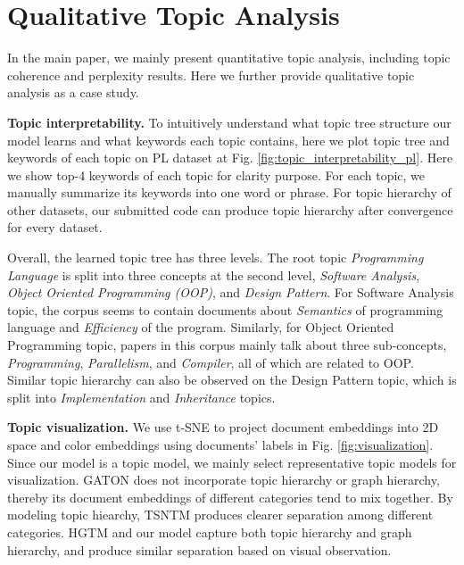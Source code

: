 \section{Qualitative Topic Analysis}
\label{sec:qualitative_topic_analysis}

In the main paper, we mainly present quantitative topic analysis, including topic coherence and perplexity results. Here we further provide qualitative topic analysis as a case study.

\textbf{Topic interpretability.} To intuitively understand what topic tree structure our model learns and what keywords each topic contains, here we plot topic tree and keywords of each topic on PL dataset at Fig. \ref{fig:topic_interpretability_pl}. Here we show top-4 keywords of each topic for clarity purpose. For each topic, we manually summarize its keywords into one word or phrase. For topic hierarchy of other datasets, our submitted code can produce topic hierarchy after convergence for every dataset.

Overall, the learned topic tree has three levels. The root topic \textit{Programming Language} is split into three concepts at the second level, \textit{Software Analysis}, \textit{Object Oriented Programming (OOP)}, and \textit{Design Pattern}. For Software Analysis topic, the corpus seems to contain documents about \textit{Semantics} of programming language and \textit{Efficiency} of the program. Similarly, for Object Oriented Programming topic, papers in this corpus mainly talk about three sub-concepts, \textit{Programming}, \textit{Parallelism}, and \textit{Compiler}, all of which are related to OOP. Similar topic hierarchy can also be observed on the Design Pattern topic, which is split into \textit{Implementation} and \textit{Inheritance} topics.

\textbf{Topic visualization.} %
We use t-SNE \cite{tsne} to project document embeddings into 2D space and color embeddings using documents' labels in Fig. \ref{fig:visualization}. Since our model is a topic model, we mainly select representative topic models for visualization. GATON does not incorporate topic hierarchy or graph hierarchy, thereby its document embeddings of different categories tend to mix together. By modeling topic hiearchy, TSNTM produces clearer separation among different categories. HGTM and our model capture both topic hierarchy and graph hierarchy, and produce similar separation based on visual observation.

